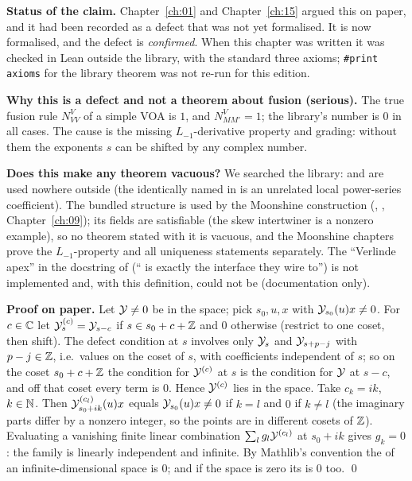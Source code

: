 \begin{dictionary}
\textbf{Status of the claim.} Chapter~\ref{ch:01} and Chapter~\ref{ch:15} argued this on paper, and it
had been recorded as a defect that was not yet formalised. It is now formalised, and the defect is \emph{confirmed}. When this chapter was written it was
checked in Lean outside the library, with the standard three axioms; \texttt{\#print axioms} for the library theorem was not
re-run for this edition.

\textbf{Why this is a defect and not a theorem about fusion (serious).} The true fusion rule $N_{VV}^V$ of a simple VOA is $1$,
and $N_{MM'}^V = 1$; the library's number is $0$ in all cases. The cause is the missing $L_{-1}$-derivative property and
grading: without them the exponents $s$ can be shifted by any complex number.

\textbf{Does this make any theorem vacuous?} We searched the library:  and  are used
nowhere outside  (the identically named  in
 is an unrelated local power-series coefficient). The
bundled  structure is used by the Moonshine construction (,
, Chapter~\ref{ch:09}); its fields are satisfiable (the skew intertwiner is a nonzero
example), so no theorem stated with it is vacuous, and the Moonshine chapters prove the $L_{-1}$-property and all
uniqueness statements separately. The ``Verlinde apex'' in the docstring of  (`` is
exactly the interface they wire to'') is not implemented and, with this definition, could not be (documentation only).
\end{dictionary}

\textbf{Proof on paper.} Let $\mathcal{Y}\neq0$ be in the space; pick $s_0,u,x$ with $\mathcal{Y}_{s_0}(u)x\neq0$. For $c\in{\mathbb{C}}$ let
$\mathcal{Y}^{(c)}_s = \mathcal{Y}_{s-c}$ if $s\in s_0+c+{\mathbb{Z}}$ and $0$ otherwise (restrict to one coset, then shift). The defect
condition at $s$ involves only $\mathcal{Y}_s$ and $\mathcal{Y}_{s+p-j}$ with $p-j\in{\mathbb{Z}}$, i.e.\ values on the coset of $s$, with
coefficients independent of $s$; so on the coset $s_0+c+{\mathbb{Z}}$ the condition for $\mathcal{Y}^{(c)}$ at $s$ is the condition for
$\mathcal{Y}$ at $s-c$, and off that coset every term is $0$. Hence $\mathcal{Y}^{(c)}$ lies in the space. Take $c_k = ik$,
$k\in{\mathbb{N}}$. Then $\mathcal{Y}^{(c_l)}_{s_0+ik}(u)x$ equals $\mathcal{Y}_{s_0}(u)x\neq0$ if $k = l$ and $0$ if $k\neq l$ (the imaginary
parts differ by a nonzero integer, so the points are in different cosets of ${\mathbb{Z}}$). Evaluating a vanishing finite linear
combination $\sum_l g_l\mathcal{Y}^{(c_l)}$ at $s_0+ik$ gives $g_k = 0$: the family is linearly independent and infinite.
By Mathlib's convention the  of an infinite-dimensional space is $0$; and if the space is zero its
 is $0$ too. \qed

